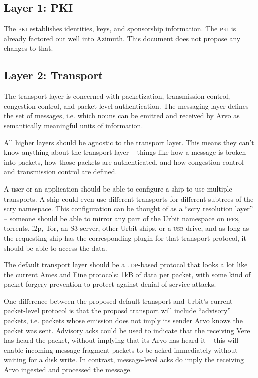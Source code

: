 \documentclass[twoside]{article}
\begin{document}
\subsection[Layer 1: \textsc{pki}]{Layer 1: PKI}

The \textsc{pki} establishes identities, keys, and sponsorship information. The \textsc{pki} is already factored out well into Azimuth. This document does not propose any changes to that.

\subsection{Layer 2: Transport}

The transport layer is concerned with packetization, transmission control, congestion control, and packet-level authentication. The messaging layer defines the set of messages, i.e. which nouns can be emitted and received by Arvo as semantically meaningful units of information.

All higher layers should be agnostic to the transport layer. This means they can't know anything about the transport layer – things like how a message is broken into packets, how those packets are authenticated, and how congestion control and transmission control are defined.

A user or an application should be able to configure a ship to use multiple transports. A ship could even use different transports for different subtrees of the scry namespace. This configuration can be thought of as a ``scry resolution layer'' – someone should be able to mirror any part of the Urbit namespace on \textsc{ipfs}, torrents, i2p, Tor, an S3 server, other Urbit ships, or a \textsc{usb} drive, and as long as the requesting ship has the corresponding plugin for that transport protocol, it should be able to access the data.

The default transport layer should be a \textsc{udp}-based protocol that looks a lot like the current Ames and Fine protocols: 1kB of data per packet, with some kind of packet forgery prevention to protect against denial of service attacks.

One difference between the proposed default transport and Urbit's current packet-level protocol is that the proposd transport will include ``advisory'' packets, i.e. packets whose emission does not imply its sender Arvo knows the packet was sent. Advisory acks could be used to indicate that the receiving Vere has heard the packet, without implying that its Arvo has heard it – this will enable incoming message fragment packets to be acked immediately without waiting for a disk write. In contrast, message-level acks do imply the receiving Arvo ingested and processed the message.
\end{document}
